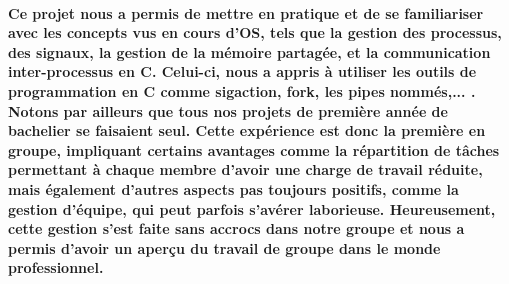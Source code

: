 \documentclass[utf8]{article}
\begin{document}
\paragraph{Ce projet nous a permis de mettre en pratique et de se familiariser avec les concepts vus en cours d'OS,
tels que la gestion des processus, des signaux, la gestion de la mémoire partagée, et la communication inter-processus en C.
Celui-ci, nous a appris à utiliser les outils de programmation en C comme sigaction, fork, les pipes nommés,... .
Notons par ailleurs que tous nos projets de première année de bachelier se faisaient seul. Cette expérience est donc
la première en groupe, impliquant certains avantages comme la répartition de tâches permettant à chaque membre d'avoir 
une charge de travail réduite, mais également d'autres aspects pas toujours positifs, comme la gestion d'équipe, qui peut 
parfois s'avérer laborieuse. Heureusement, cette gestion s'est faite sans accrocs dans notre groupe et nous a permis d'avoir
un aperçu du travail de groupe dans le monde professionnel.
}
\end{document}
